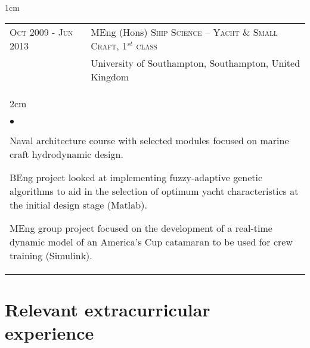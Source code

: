 \documentclass[a4paper,10pt]{article}
\newcommand{\squishlist}{
	\begin{list}{$\bullet$}
	{
		\setlength{\itemsep}{0pt}
		\setlength{\parsep}{0pt}
		\setlength{\topsep}{0pt}
		\setlength{\partopsep}{0pt}
		\setlength{\leftmargin}{2em}
		\setlength{\labelwidth}{1.5em}
		\setlength{\labelsep}{0.5em}
	}
}
\newcommand{\squishend}{\end{list}}
\begin{document}
\begin{minipage}{\textwidth}
\begin{adjustwidth}{}{1cm}
\begin{tabular}{p{3.8cm} p{12.5cm}}
\textsc{Oct 2009 - Jun 2013} & MEng (Hons) \textsc{Ship Science – Yacht \& Small Craft, 1$^{st}$ class} \\
& University of Southampton, Southampton, United Kingdom \vspace{0.1cm} \\
%
\multicolumn{2}{l}{
\hspace{1cm}\begin{minipage}[t]{\textwidth}
\begin{adjustwidth}{}{2cm}
\squishlist
	\item Naval architecture course with selected modules focused on marine craft hydrodynamic design.
	\item BEng project looked at implementing fuzzy-adaptive genetic algorithms to aid in the selection
		of optimum yacht characteristics at the initial design stage (Matlab).
	\item MEng group project focused on the development of a real-time dynamic model of an America's Cup
		catamaran to be used for crew training (Simulink).
\squishend
\end{adjustwidth}
\end{minipage}
} \\

\end{tabular}

\end{adjustwidth}
\end{minipage}


\section{Relevant extracurricular experience}
\end{document}
